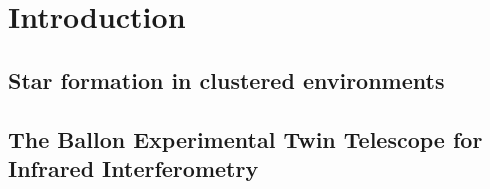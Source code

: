 
\chapter{Introduction} %

\label{chap:introduction} %


\section{Star formation in clustered environments}

\section{The Ballon Experimental Twin Telescope for Infrared Interferometry}





